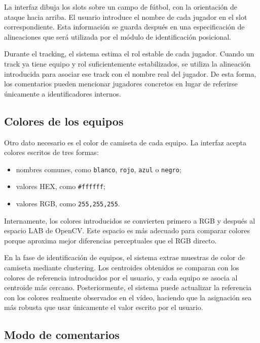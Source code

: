 La interfaz dibuja los slots sobre un campo de fútbol, con la orientación de ataque hacia arriba. El usuario introduce el nombre de cada jugador en el slot correspondiente. Esta información se guarda después en una especificación de alineaciones que será utilizada por el módulo de identificación posicional.

Durante el tracking, el sistema estima el rol estable de cada jugador. Cuando un track ya tiene equipo y rol suficientemente estabilizados, se utiliza la alineación introducida para asociar ese track con el nombre real del jugador. De esta forma, los comentarios pueden mencionar jugadores concretos en lugar de referirse únicamente a identificadores internos.

\subsection{Colores de los equipos}

Otro dato necesario es el color de camiseta de cada equipo. La interfaz acepta colores escritos de tres formas:

\begin{itemize}
    \item nombres comunes, como \texttt{blanco}, \texttt{rojo}, \texttt{azul} o \texttt{negro};
    \item valores HEX, como \texttt{\#ffffff};
    \item valores RGB, como \texttt{255,255,255}.
\end{itemize}

Internamente, los colores introducidos se convierten primero a RGB y después al espacio LAB de OpenCV. Este espacio es más adecuado para comparar colores porque aproxima mejor diferencias perceptuales que el RGB directo.

En la fase de identificación de equipos, el sistema extrae muestras de color de camiseta mediante clustering. Los centroides obtenidos se comparan con los colores de referencia introducidos por el usuario, y cada equipo se asocia al centroide más cercano. Posteriormente, el sistema puede actualizar la referencia con los colores realmente observados en el vídeo, haciendo que la asignación sea más robusta que usar únicamente el valor escrito por el usuario.

\subsection{Modo de comentarios}


